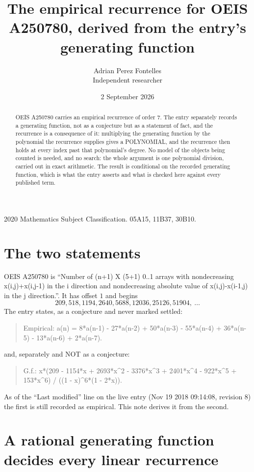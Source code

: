 \documentclass[11pt,a4paper]{article}
\title{The empirical recurrence for OEIS A250780, derived from the entry's generating function}
\author{Adrian Perez Fontelles\\ \small Independent researcher}
\date{2 September 2026}
\theoremstyle{plain}
\theoremstyle{definition}
\begin{document}
\maketitle

\begin{abstract}
OEIS A250780 carries an empirical recurrence of order $7$. The entry separately records a
generating function, not as a conjecture but as a statement of fact, and the recurrence is a
consequence of it: multiplying the generating function by the polynomial the recurrence
supplies gives a POLYNOMIAL, and the recurrence then holds at every index past that
polynomial's degree. No model of the objects being counted is needed, and no search: the
whole argument is one polynomial division, carried out in exact arithmetic. The result is
conditional on the recorded generating function, which is what the entry asserts and what is
checked here against every published term.
\end{abstract}

\noindent\small 2020 Mathematics Subject Classification. 05A15, 11B37, 30B10.\normalsize

\section{The two statements}

OEIS A250780 is ``Number of (n+1) X (5+1) 0..1 arrays with nondecreasing x(i,j)+x(i,j-1) in the i direction and nondecreasing absolute value of x(i,j)-x(i-1,j) in the j direction.''. It has offset $1$ and begins
\[
209, 518, 1194, 2640, 5688, 12036, 25126, 51904,\ \dots
\]
The entry states, as a conjecture and never marked settled:
\begin{quote}
Empirical: a(n) = 8*a(n-1) - 27*a(n-2) + 50*a(n-3) - 55*a(n-4) + 36*a(n-5) - 13*a(n-6) + 2*a(n-7).
\end{quote}
and, separately and NOT as a conjecture:
\begin{quote}
G.f.: x*(209 - 1154*x + 2693*x\^{}2 - 3376*x\^{}3 + 2401*x\^{}4 - 922*x\^{}5 + 153*x\^{}6) / ((1 - x)\^{}6*(1 - 2*x)).
\end{quote}
As of the ``Last modified'' line on the live entry (Nov 19 2018 09:14:08, revision 8) the first is still
recorded as empirical. This note derives it from the second.

\section{A rational generating function decides every linear recurrence}
\end{document}

